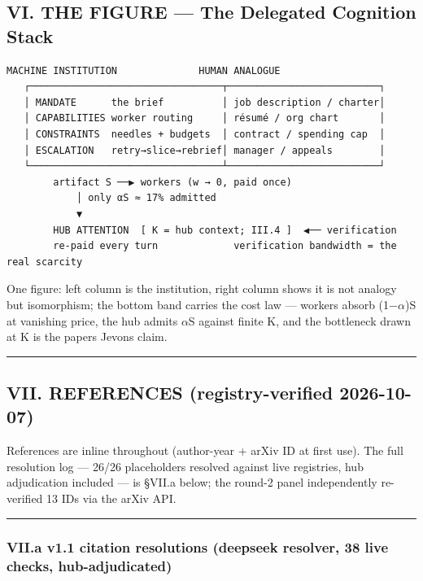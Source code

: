 \documentclass[
]{article}
\begin{document}
\subsection{VI. THE FIGURE --- The Delegated Cognition
Stack}\label{vi-the-figure--the-delegated-cognition-stack}

\begin{Verbatim}[breaklines,breakanywhere,fontsize=\small]
            MACHINE INSTITUTION              HUMAN ANALOGUE
   ┌─────────────────────────────────┬──────────────────────────┐
   │ MANDATE      the brief          │ job description / charter│
   │ CAPABILITIES worker routing     │ résumé / org chart       │
   │ CONSTRAINTS  needles + budgets  │ contract / spending cap  │
   │ ESCALATION   retry→slice→rebrief│ manager / appeals        │
   └─────────────────────────────────┴──────────────────────────┘
        artifact S ──▶ workers (w → 0, paid once)
            │ only αS ≈ 17% admitted
            ▼
        HUB ATTENTION  [ K = hub context; III.4 ]  ◀── verification
        re-paid every turn             verification bandwidth = the real scarcity
\end{Verbatim}

One figure: left column is the institution, right column shows it is not
analogy but isomorphism; the bottom band carries the cost law ---
workers absorb (1$-$$\alpha$)S at vanishing price, the hub admits $\alpha$S against
finite K, and the bottleneck drawn at K is the paper\textquotesingle s
Jevons claim.

\begin{center}\rule{0.5\linewidth}{0.5pt}\end{center}

\subsection{VII. REFERENCES (registry-verified
2026-10-07)}\label{vii-references-registry-verified-2026-10-07}

References are inline throughout (author-year + arXiv ID at first use).
The full resolution log --- 26/26 placeholders resolved against live
registries, hub adjudication included --- is \S{}VII.a below; the round-2
panel independently re-verified 13 IDs via the arXiv API.

\begin{center}\rule{0.5\linewidth}{0.5pt}\end{center}

\subsubsection{VII.a v1.1 citation resolutions (deepseek resolver, 38
live checks,
hub-adjudicated)}\label{viia-v11-citation-resolutions-deepseek-resolver-38-live-checks-hub-adjudicated}
\end{document}
